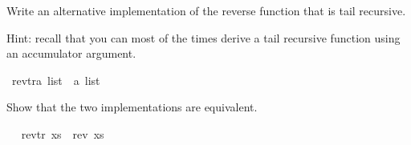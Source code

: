 \begin{isabellebody}
\begin{isamarkuptext}
  Write an alternative implementation of the reverse function that is tail recursive.

  Hint: recall that you can most of the times derive a tail recursive function using an accumulator
        argument.%
\end{isamarkuptext}\isamarkuptrue%
\isanewline
\isanewline
\isanewline
{}\isamarkupfalse%
\ rev{\isacharunderscore}{\kern0pt}tr{\isacharcolon}{\kern0pt}{\isacharcolon}{\kern0pt}{\isachardoublequoteopen}{\isacharprime}{\kern0pt}a\ list\ {\isasymRightarrow}\ {\isacharprime}{\kern0pt}a\ list{\isachardoublequoteclose}\ %
\begin{isamarkuptext}%
Show that the two implementations are equivalent.%
\end{isamarkuptext}\isamarkuptrue%
%
\isadelimproof
%
\endisadelimproof
%
\isatagproof
%
\endisatagproof
{\isafoldproof}%
%
\isadelimproof
\ \isanewline
%
\endisadelimproof
{}\isamarkupfalse%
\ {\isachardoublequoteopen}rev{\isacharunderscore}{\kern0pt}tr\ xs\ {\isacharequal}{\kern0pt}\ rev\ xs{\isachardoublequoteclose}%
\isadelimproof
%
\endisadelimproof
%
\isatagproof
%
\endisatagproof
{\isafoldproof}%
%
\isadelimproof
%
\endisadelimproof
%
\isadelimtheory
%
\endisadelimtheory
%
\isatagtheory
%
\endisatagtheory
{\isafoldtheory}%
%
\isadelimtheory
%
\endisadelimtheory
%
\end{isabellebody}%
\endinput
